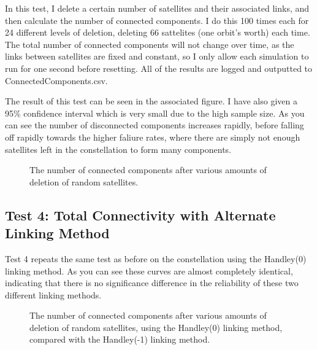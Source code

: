 \documentclass[12pt]{article}
\begin{document}
In this test, I delete a certain number of satellites and their associated links, and then calculate the number of connected components. I do this 100 times each for 24 different levels of deletion, deleting 66 sattelites (one orbit's worth) each time. The total number of connected components will not change over time, as the links between satellites are fixed and constant, so I only allow each simulation to run for one second before resetting. All of the results are logged and outputted to ConnectedComponents.csv.

The result of this test can be seen in the associated figure. I have also given a 95\% confidence interval which is very small due to the high sample size. As you can see the number of disconnected components increases rapidly, before falling off rapidly towards the higher faliure rates, where there are simply not enough satellites left in the constellation to form many components.

\begin{figure}
\label{fig:Connected Components After Deletions}
\caption{The number of connected components after various amounts of deletion of random satellites.}
\end{figure}

\subsection{Test 4: Total Connectivity with Alternate Linking Method}

Test 4 repeats the same test as before on the constellation using the Handley(0) linking method. As you can see these curves are almost completely identical, indicating that there is no significance difference in the reliability of these two different linking methods.

\begin{figure}
\label{fig:Connected Components After Deletions Variant}
\caption{The number of connected components after various amounts of deletion of random satellites, using the Handley(0) linking method, compared with the Handley(-1) linking method.}
\end{figure}
\end{document}
